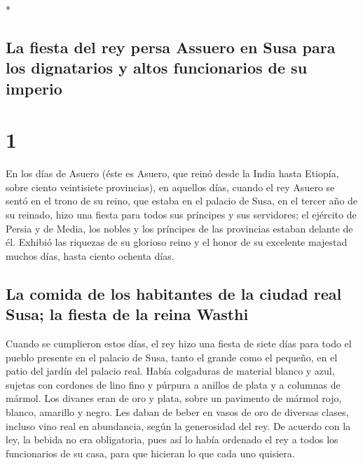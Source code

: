 \begin{paracol}{2} \switchcolumn[0]*

\hypertarget{la-fiesta-del-rey-persa-assuero-en-susa-para-los-dignatarios-y-altos-funcionarios-de-su-imperio}{%
\subsection{La fiesta del rey persa Assuero en Susa para los dignatarios
y altos funcionarios de su
imperio}\label{la-fiesta-del-rey-persa-assuero-en-susa-para-los-dignatarios-y-altos-funcionarios-de-su-imperio}}

\hypertarget{section}{%
\section{1}\label{section}}

 En los días de Asuero (éste es Asuero, que reinó desde la
India hasta Etiopía, sobre ciento veintisiete provincias),
 en aquellos días, cuando el rey Asuero se sentó en el
trono de su reino, que estaba en el palacio de Susa,  en
el tercer año de su reinado, hizo una fiesta para todos sus príncipes y
sus servidores; el ejército de Persia y de Media, los nobles y los
príncipes de las provincias estaban delante de él. 
Exhibió las riquezas de su glorioso reino y el honor de su excelente
majestad muchos días, hasta ciento ochenta días.

\hypertarget{la-comida-de-los-habitantes-de-la-ciudad-real-susa-la-fiesta-de-la-reina-wasthi}{%
\subsection{La comida de los habitantes de la ciudad real Susa; la
fiesta de la reina
Wasthi}\label{la-comida-de-los-habitantes-de-la-ciudad-real-susa-la-fiesta-de-la-reina-wasthi}}

 Cuando se cumplieron estos días, el rey hizo una fiesta
de siete días para todo el pueblo presente en el palacio de Susa, tanto
el grande como el pequeño, en el patio del jardín del palacio real.
 Había colgaduras de material blanco y azul, sujetas con
cordones de lino fino y púrpura a anillos de plata y a columnas de
mármol. Los divanes eran de oro y plata, sobre un pavimento de mármol
rojo, blanco, amarillo y negro.  Les daban de beber en
vasos de oro de diversas clases, incluso vino real en abundancia, según
la generosidad del rey.  De acuerdo con la ley, la bebida
no era obligatoria, pues así lo había ordenado el rey a todos los
funcionarios de su casa, para que hicieran lo que cada uno quisiera.


\end{paracol}
